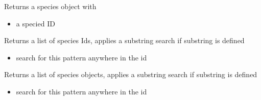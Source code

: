 \documentclass[letterpaper,10pt,english]{sphinxmanual}
\begin{document}
\begin{fulllineitems}
\begin{fulllineitems}
\begin{itemize}
\end{itemize}

\end{fulllineitems}


\begin{fulllineitems}
\label{\detokenize{modules_doc:cbmpy.CBModel.Model.getSpecies}}
\pysigstartsignatures
{}
\pysigstopsignatures
\sphinxAtStartPar
Returns a species object with 
\begin{itemize}
\item {} 
\sphinxAtStartPar
{} a specied ID

\end{itemize}

\end{fulllineitems}


\begin{fulllineitems}
\label{\detokenize{modules_doc:cbmpy.CBModel.Model.getSpeciesIds}}
\pysigstartsignatures
{}
\pysigstopsignatures
\sphinxAtStartPar
Returns a list of species Ids, applies a substring search if substring is defined
\begin{itemize}
\item {} 
\sphinxAtStartPar
{} search for this pattern anywhere in the id

\end{itemize}

\end{fulllineitems}


\begin{fulllineitems}
\label{\detokenize{modules_doc:cbmpy.CBModel.Model.getSpeciesObjects}}
\pysigstartsignatures
{}
\pysigstopsignatures
\sphinxAtStartPar
Returns a list of species objects, applies a substring search if substring is defined
\begin{itemize}
\item {} 
\sphinxAtStartPar
{} search for this pattern anywhere in the id


\end{itemize}
\end{fulllineitems}
\end{fulllineitems}
\end{document}
